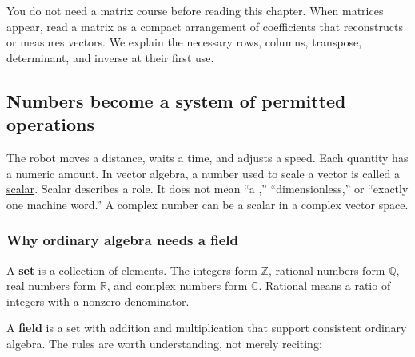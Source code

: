 You do not need a matrix course before reading this chapter. When matrices appear, read a matrix as a compact arrangement of coefficients that reconstructs or measures vectors. We explain the necessary rows, columns, transpose, determinant, and inverse at their first use.

\subsection{Numbers become a system of permitted operations}\label{01-foundations-i-ch017-numbers-become-a-system-of-permitted-operations}

\hypertarget{01-foundations-i-ch017-numbers-become-a-system-of-permitted-operations}{}

The robot moves a distance, waits a time, and adjusts a speed. Each quantity has a numeric amount. In vector algebra, a number used to scale a vector is called a \hyperref[01-foundations-i-ch017-numbers-become-a-system-of-permitted-operations]{scalar}. Scalar describes a role. It does not mean ``a ,'' ``dimensionless,'' or ``exactly one machine word.'' A complex number can be a scalar in a complex vector space.

\subsubsection{Why ordinary algebra needs a field}\label{01-foundations-i-ch017-why-ordinary-algebra-needs-a-field}

\hypertarget{01-foundations-i-ch017-why-ordinary-algebra-needs-a-field}{}

A \textbf{set} is a collection of elements. The integers form \(\mathbb Z\), rational numbers form \(\mathbb Q\), real numbers form \(\mathbb R\), and complex numbers form \(\mathbb C\). Rational means a ratio of integers with a nonzero denominator.

A \textbf{field} is a set with addition and multiplication that support consistent ordinary algebra. The rules are worth understanding, not merely reciting:

